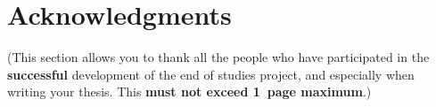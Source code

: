 \chapter*{Acknowledgments}

(This section allows you to thank all the people who have participated in the \textbf{successful} development of the end of studies project, and especially when writing your thesis. This \textbf{must not exceed 1~page maximum}.)